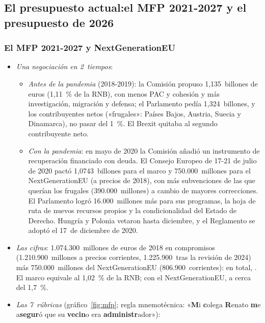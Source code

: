 \documentclass[11pt]{article}
\begin{document}
\subsection{El presupuesto actual:\cortetitulo el MFP 2021-2027 y el presupuesto de 2026}\label{sec:actual}

\subsubsection{El MFP 2021-2027 y NextGenerationEU}\label{sec:mfp-actual}

\begin{itemize}
\item \emph{Una negociación en 2~tiempos}:
  \begin{itemize}
  \item \emph{Antes de la pandemia} (2018-2019): la Comisión propuso 1,135~billones de euros (1,11~\% de la RNB), con menos PAC y cohesión y más investigación, migración y defensa; el Parlamento pedía 1,324~billones, y los contribuyentes netos («frugales»: Países Bajos, Austria, Suecia y Dinamarca), no pasar del 1~\%. El Brexit quitaba al segundo contribuyente neto.
  \item \emph{Con la pandemia}: en mayo de 2020 la Comisión añadió un instrumento de recuperación financiado con deuda. El Consejo Europeo de 17-21 de julio de 2020 pactó 1,0743~billones para el marco y 750.000~millones para el NextGenerationEU (a precios de 2018), con más subvenciones de las que querían los frugales (390.000~millones) a cambio de mayores correcciones\nocite{ConsejoEuropeo2020Conclusiones}. El Parlamento logró 16.000~millones más para sus programas, la hoja de ruta de nuevos recursos propios y la condicionalidad del Estado de Derecho. Hungría y Polonia vetaron hasta diciembre, y el Reglamento se adoptó el 17~de diciembre de 2020.
  \end{itemize}
\item \emph{Las cifras}: 1.074.300~millones de euros de 2018 en compromisos (1.210.900~millones a precios corrientes, 1.225.900~tras la revisión de 2024) más 750.000~millones del NextGenerationEU (806.900~corrientes): en total, . El marco equivale al 1,02~\% de la RNB; con el NextGenerationEU, a cerca del 1,7~\%\nocite{UE2020MFP,CE2026Rubricas}.
\item \emph{Las 7~rúbricas} (gráfico~\ref{fig:mfp}; regla mnemotécnica: «\textbf{M}i \textbf{c}olega \textbf{R}enato \textbf{m}e a\textbf{segur}ó que su \textbf{vecin}o era \textbf{administr}ador»):

\end{itemize}
\end{document}
